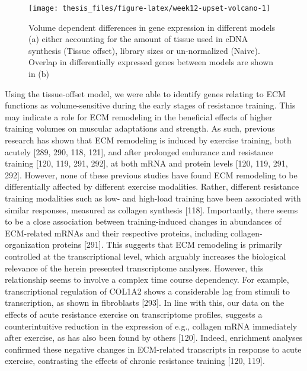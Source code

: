 \documentclass[twoside,10pt]{gihclass} %
\begin{document}
\begin{figure}

{\centering \texttt{[image: thesis\_files/figure-latex/week12-upset-volcano-1]} 

}

\caption[General patterns of differentially expressed genes at Week 12]{Volume dependent differences in gene expression in different models (a) either accounting for the amount of tissue used in cDNA synthesis (Tissue offset), library sizes or un-normalized (Naive). Overlap in differentially expressed genes between models are shown in (b)}\label{fig:week12-upset-volcano}
\end{figure}
Using the tissue-offset model, we were able to identify genes relating to ECM functions as volume-sensitive during the early stages of resistance training. This may indicate a role for ECM remodeling in the beneficial effects of higher training volumes on muscular adaptations and strength. As such, previous research has shown that ECM remodeling is induced by exercise training, both acutely {[}289, 290, 118, 121{]},
and after prolonged endurance and resistance training {[}120, 119, 291, 292{]},
at both mRNA and protein levels {[}120, 119, 291, 292{]}.
However, none of these previous studies have found ECM remodeling to be differentially affected by different exercise modalities. Rather, different resistance training modalities such as low- and high-load training have been associated with similar responses, measured as collagen synthesis {[}118{]}.
Importantly, there seems to be a close association between training-induced changes in abundances of ECM-related mRNAs and their respective proteins, including collagen-organization proteins {[}291{]}.
This suggests that ECM remodeling is primarily controlled at the transcriptional level, which arguably increases the biological relevance of the herein presented transcriptome analyses.
However, this relationship seems to involve a complex time course dependency. For example, transcriptional regulation of COL1A2 shows a considerable lag from stimuli to transcription, as shown in fibroblasts {[}293{]}.
In line with this, our data on the effects of acute resistance exercise on transcriptome profiles, suggests a counterintuitive reduction in the expression of e.g., collagen mRNA immediately after exercise, as has also been found by others {[}120{]}.
Indeed, enrichment analyses confirmed these negative changes in ECM-related transcripts in response to acute exercise, contrasting the effects of chronic resistance training {[}120, 119{]}.
\end{document}
